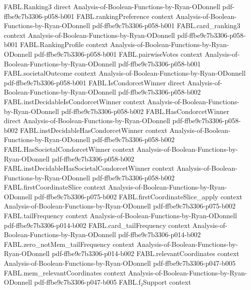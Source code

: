 \begin{theorem}
\proofstep
  {FABL.Ranking3}
  {direct}
  {Analysis-of-Boolean-Functions-by-Ryan-ODonnell}
  {pdf-ffbe9c7b3306-p058-b001}
\proofstep
  {FABL.rankingPreference}
  {context}
  {Analysis-of-Boolean-Functions-by-Ryan-ODonnell}
  {pdf-ffbe9c7b3306-p058-b001}
\proofstep
  {FABL.card_ranking3}
  {context}
  {Analysis-of-Boolean-Functions-by-Ryan-ODonnell}
  {pdf-ffbe9c7b3306-p058-b001}
\proofstep
  {FABL.RankingProfile}
  {context}
  {Analysis-of-Boolean-Functions-by-Ryan-ODonnell}
  {pdf-ffbe9c7b3306-p058-b001}
\proofstep
  {FABL.pairwiseVotes}
  {context}
  {Analysis-of-Boolean-Functions-by-Ryan-ODonnell}
  {pdf-ffbe9c7b3306-p058-b001}
\proofstep
  {FABL.societalOutcome}
  {context}
  {Analysis-of-Boolean-Functions-by-Ryan-ODonnell}
  {pdf-ffbe9c7b3306-p058-b001}
\proofstep
  {FABL.IsCondorcetWinner}
  {direct}
  {Analysis-of-Boolean-Functions-by-Ryan-ODonnell}
  {pdf-ffbe9c7b3306-p058-b002}
\proofstep
  {FABL.instDecidableIsCondorcetWinner}
  {context}
  {Analysis-of-Boolean-Functions-by-Ryan-ODonnell}
  {pdf-ffbe9c7b3306-p058-b002}
\proofstep
  {FABL.HasCondorcetWinner}
  {direct}
  {Analysis-of-Boolean-Functions-by-Ryan-ODonnell}
  {pdf-ffbe9c7b3306-p058-b002}
\proofstep
  {FABL.instDecidableHasCondorcetWinner}
  {context}
  {Analysis-of-Boolean-Functions-by-Ryan-ODonnell}
  {pdf-ffbe9c7b3306-p058-b002}
\proofstep
  {FABL.HasSocietalCondorcetWinner}
  {context}
  {Analysis-of-Boolean-Functions-by-Ryan-ODonnell}
  {pdf-ffbe9c7b3306-p058-b002}
\proofstep
  {FABL.instDecidableHasSocietalCondorcetWinner}
  {context}
  {Analysis-of-Boolean-Functions-by-Ryan-ODonnell}
  {pdf-ffbe9c7b3306-p058-b002}
\proofstep
  {FABL.firstCoordinateSlice}
  {context}
  {Analysis-of-Boolean-Functions-by-Ryan-ODonnell}
  {pdf-ffbe9c7b3306-p075-b002}
\proofstep
  {FABL.firstCoordinateSlice_apply}
  {context}
  {Analysis-of-Boolean-Functions-by-Ryan-ODonnell}
  {pdf-ffbe9c7b3306-p075-b002}
\proofstep
  {FABL.tailFrequency}
  {context}
  {Analysis-of-Boolean-Functions-by-Ryan-ODonnell}
  {pdf-ffbe9c7b3306-p014-b002}
\proofstep
  {FABL.card_tailFrequency}
  {context}
  {Analysis-of-Boolean-Functions-by-Ryan-ODonnell}
  {pdf-ffbe9c7b3306-p014-b002}
\proofstep
  {FABL.zero_notMem_tailFrequency}
  {context}
  {Analysis-of-Boolean-Functions-by-Ryan-ODonnell}
  {pdf-ffbe9c7b3306-p014-b002}
\proofstep
  {FABL.relevantCoordinates}
  {context}
  {Analysis-of-Boolean-Functions-by-Ryan-ODonnell}
  {pdf-ffbe9c7b3306-p047-b005}
\proofstep
  {FABL.mem_relevantCoordinates}
  {context}
  {Analysis-of-Boolean-Functions-by-Ryan-ODonnell}
  {pdf-ffbe9c7b3306-p047-b005}
\proofstep
  {FABL.f₂Support}
  {context}

\end{theorem}
